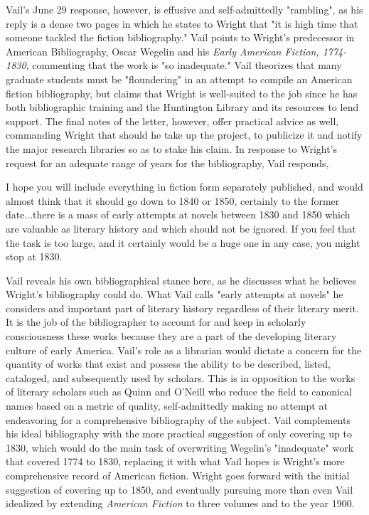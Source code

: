 Vail's June 29 response, however, is effusive and self-admittedly "rambling", as his reply is a dense two pages in which he states to Wright that "it is high time that someone tackled the fiction bibliography."\autocite{robert_g._vail_letter_1933} Vail points to Wright's predecessor in American Bibliography, Oscar Wegelin and his \textit{Early American Fiction, 1774-1830}, commenting that the work is "so inadequate."\autocite{robert_g._vail_letter_1933} Vail theorizes that many graduate students must be "floundering" in an attempt to compile an American fiction bibliography, but claims that Wright is well-suited to the job since he has both bibliographic training and the Huntington Library and its resources to lend support. The final notes of the letter, however, offer practical advice as well, commanding Wright that should he take up the project, to publicize it and notify the major research libraries so as to stake his claim. In response to Wright's request for an adequate range of years for the bibliography, Vail responds, 
\begin{displayquote}
I hope you will include everything in fiction form separately published, and would almost think that it should go down to 1840 or 1850, certainly to the former date...there is a mass of early attempts at novels between 1830 and 1850 which are valuable as literary history and which should not be ignored. If you feel that the task is too large, and it certainly would be a huge one in any case, you might stop at 1830.\autocite{robert_g._vail_letter_1933}
\end{displayquote}
Vail reveals his own bibliographical stance here, as he discusses what he believes Wright's bibliography could do. What Vail calls "early attempts at novels" he considers and important part of literary history regardless of their literary merit. It is the job of the bibliographer to account for and keep in scholarly consciousness these works because they are a part of the developing literary culture of early America. Vail's role as a librarian would dictate a concern for the quantity of works that exist and possess the ability to be described, listed, cataloged, and subsequently used by scholars. This is in opposition to the works of literary scholars such as Quinn and O'Neill who reduce the field to canonical names based on a metric of quality, self-admittedly making no attempt at endeavoring for a comprehensive bibliography of the subject. Vail complements his ideal bibliography with the more practical suggestion of only covering up to 1830, which would do the main task of overwriting Wegelin's "inadequate" work that covered 1774 to 1830, replacing it with what Vail hopes is Wright's more comprehensive record of American fiction. Wright goes forward with the initial suggestion of covering up to 1850, and eventually pursuing more than even Vail idealized by extending \textit{American Fiction} to three volumes and to the year 1900.

